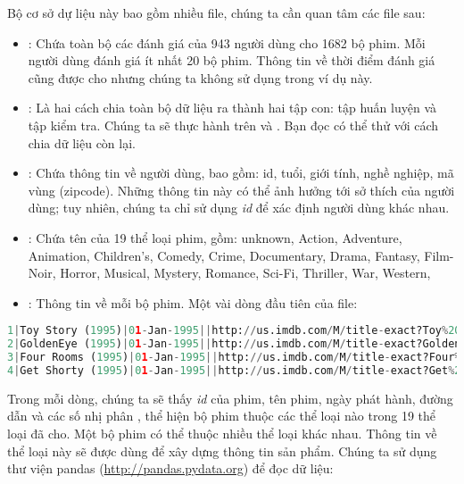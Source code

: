 Bộ cơ sở dự liệu này bao gồm nhiều file, chúng
ta cần quan tâm các file sau:
\begin{itemize}
\item {}: Chứa toàn bộ các đánh giá của 943 người dùng
cho 1682 bộ phim. Mỗi người dùng đánh giá ít nhất 20 bộ phim. Thông tin
về thời điểm đánh giá cũng được cho nhưng chúng ta không sử dụng trong ví dụ
này.

\item {}: Là hai cách chia toàn
bộ dữ liệu ra thành hai tập con: tập huấn luyện và tập kiểm tra. Chúng ta
sẽ thực hành trên  và . Bạn đọc có thể thử với cách chia dữ liệu còn lại.

\item {}: Chứa thông tin về người dùng, bao gồm: id, tuổi,
giới tính, nghề nghiệp, mã vùng (zipcode). Những thông tin này có thể
ảnh hưởng tới sở thích của người dùng; tuy nhiên, chúng
ta chỉ sử dụng \textit{id} để xác định người dùng khác nhau.

\item {}: Chứa tên của 19 thể loại phim, gồm: {unknown, Action, Adventure, Animation, Children's, Comedy, Crime, Documentary, Drama, Fantasy, Film-Noir, Horror, Musical, Mystery, Romance, Sci-Fi, Thriller, War, Western,}

\item {}: Thông tin về mỗi bộ phim. Một vài dòng đầu tiên của file:
\end{itemize}
\begin{lstlisting}[language=Python]
1|Toy Story (1995)|01-Jan-1995||http://us.imdb.com/M/title-exact?Toy%20Story%20(1995)|0|0|0|1|1|1|0|0|0|0|0|0|0|0|0|0|0|0|0
2|GoldenEye (1995)|01-Jan-1995||http://us.imdb.com/M/title-exact?GoldenEye%20(1995)|0|1|1|0|0|0|0|0|0|0|0|0|0|0|0|0|1|0|0
3|Four Rooms (1995)|01-Jan-1995||http://us.imdb.com/M/title-exact?Four%20Rooms%20(1995)|0|0|0|0|0|0|0|0|0|0|0|0|0|0|0|0|1|0|0
4|Get Shorty (1995)|01-Jan-1995||http://us.imdb.com/M/title-exact?Get%20Shorty%20(1995)|0|1|0|0|0|1|0|0|1|0|0|0|0|0|0|0|0|0|0
\end{lstlisting}
Trong mỗi dòng, chúng ta sẽ thấy \textit{id} của phim, tên phim, ngày phát hành, đường dẫn và các số nhị phân ,  thể hiện bộ phim thuộc các thể loại nào trong 19 thể loại đã cho. Một bộ phim có thể thuộc nhiều thể loại khác nhau. Thông tin về thể loại này sẽ được dùng để xây dựng thông tin sản phẩm.
\newpage
Chúng ta sử dụng thư viện
pandas (\url{http://pandas.pydata.org}) để đọc dữ liệu:

